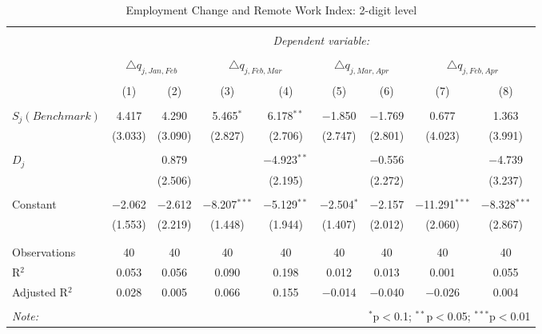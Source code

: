 
\begin{table}[!htbp] \centering 
  \caption{Employment Change and Remote Work Index: 2-digit level} 
  \label{tab:regression_dynamics_2digit} 
\footnotesize 
\begin{tabular}{@{\extracolsep{5pt}}lcccccccc} 
\\[-1.8ex]\hline 
\hline \\[-1.8ex] 
 & \multicolumn{8}{c}{\textit{Dependent variable:}} \\ 
\cline{2-9} 
\\[-1.8ex] & \multicolumn{2}{c}{$\triangle q_{j,Jan,Feb}$} & \multicolumn{2}{c}{$\triangle q_{j,Feb,Mar}$} & \multicolumn{2}{c}{$\triangle q_{j,Mar,Apr}$} & \multicolumn{2}{c}{$\triangle q_{j,Feb,Apr}$} \\ 
\\[-1.8ex] & (1) & (2) & (3) & (4) & (5) & (6) & (7) & (8)\\ 
\hline \\[-1.8ex] 
 $S_{j} (Benchmark)$ & 4.417 & 4.290 & 5.465$^{*}$ & 6.178$^{**}$ & $-$1.850 & $-$1.769 & 0.677 & 1.363 \\ 
  & (3.033) & (3.090) & (2.827) & (2.706) & (2.747) & (2.801) & (4.023) & (3.991) \\ 
  & & & & & & & & \\ 
 $D_{j}$ &  & 0.879 &  & $-$4.923$^{**}$ &  & $-$0.556 &  & $-$4.739 \\ 
  &  & (2.506) &  & (2.195) &  & (2.272) &  & (3.237) \\ 
  & & & & & & & & \\ 
 Constant & $-$2.062 & $-$2.612 & $-$8.207$^{***}$ & $-$5.129$^{**}$ & $-$2.504$^{*}$ & $-$2.157 & $-$11.291$^{***}$ & $-$8.328$^{***}$ \\ 
  & (1.553) & (2.219) & (1.448) & (1.944) & (1.407) & (2.012) & (2.060) & (2.867) \\ 
  & & & & & & & & \\ 
\hline \\[-1.8ex] 
Observations & 40 & 40 & 40 & 40 & 40 & 40 & 40 & 40 \\ 
R$^{2}$ & 0.053 & 0.056 & 0.090 & 0.198 & 0.012 & 0.013 & 0.001 & 0.055 \\ 
Adjusted R$^{2}$ & 0.028 & 0.005 & 0.066 & 0.155 & $-$0.014 & $-$0.040 & $-$0.026 & 0.004 \\ 
\hline 
\hline \\[-1.8ex] 
\textit{Note:}  & \multicolumn{8}{r}{$^{*}$p$<$0.1; $^{**}$p$<$0.05; $^{***}$p$<$0.01} \\ 
\end{tabular} 
\end{table} 
